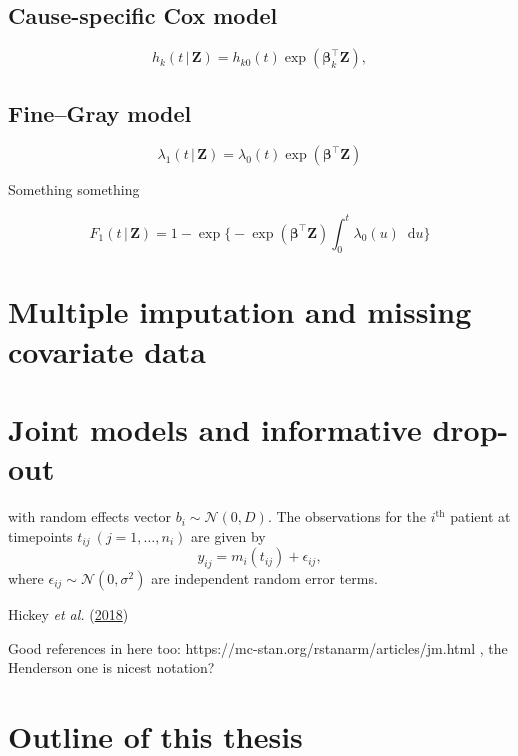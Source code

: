 \documentclass[
  letterpaper,
  DIV=11,
  numbers=noendperiod]{scrreprt}
\newcommand{\given}{\,|\,}
\newcommand\diff{\mathop{}\!\mathrm{d}}
\begin{document}
\hypertarget{cause-specific-cox-model}{%
\subsection{Cause-specific Cox model}\label{cause-specific-cox-model}}

\[
h_k(t \given \mathbf{Z}) = h_{k0}(t)\exp(\boldsymbol{\beta}_k^\intercal \mathbf{Z}),
\]

\hypertarget{finegray-model}{%
\subsection{Fine--Gray model}\label{finegray-model}}

\[
\lambda_1(t \given \mathbf{Z}) = \lambda_{0}(t)\exp(\boldsymbol{\beta}^\intercal \mathbf{Z})
\]

Something something

\[
F_1(t \given \mathbf{Z}) = 1 - \exp \Biggl\{ -\exp(\boldsymbol{\beta}^\intercal \mathbf{Z}) \int_{0}^{t} \lambda_{0}(u)\diff u \Biggr\}
\]

\hypertarget{sec-intro-MI}{%
\section{Multiple imputation and missing covariate
data}\label{sec-intro-MI}}

\hypertarget{sec-intro-jms}{%
\section{Joint models and informative drop-out}\label{sec-intro-jms}}

with random effects vector \(b_{i} \sim \mathcal{N}(0, D)\). The
observations for the \(i^{\text{th}}\) patient at timepoints
\(t_{ij} \ (j = 1,\ldots,n_i)\) are given by \[
y_{ij} = m_i(t_{ij}) + \epsilon_{ij},
\] where \(\epsilon_{ij} \sim \mathcal{N}(0, \sigma^2)\) are independent
random error terms.

Hickey \emph{et al.}
(\protect\hyperlink{ref-hickeyComparisonJointModels2018a}{2018})

Good references in here too:
https://mc-stan.org/rstanarm/articles/jm.html , the Henderson one is
nicest notation?

\hypertarget{sec-intro-outline}{%
\section{Outline of this thesis}\label{sec-intro-outline}}
\end{document}
